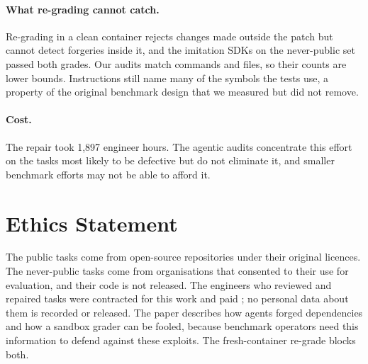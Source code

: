 \paragraph{What re-grading cannot catch.} Re-grading in a clean container rejects changes made outside the patch but cannot detect forgeries inside it, and the imitation SDKs on the never-public set passed both grades. Our audits match commands and files, so their counts are lower bounds. Instructions still name many of the symbols the tests use, a property of the original benchmark design that we measured but did not remove.

\paragraph{Cost.} The repair took 1{,}897 engineer hours. The agentic audits concentrate this effort on the tasks most likely to be defective but do not eliminate it, and smaller benchmark efforts may not be able to afford it.

\section*{Ethics Statement}
The public tasks come from open-source repositories under their original licences. The never-public tasks come from organisations that consented to their use for evaluation, and their code is not released. The engineers who reviewed and repaired tasks were contracted for this work and paid ; no personal data about them is recorded or released. The paper describes how agents forged dependencies and how a sandbox grader can be fooled, because benchmark operators need this information to defend against these exploits. The fresh-container re-grade blocks both.
